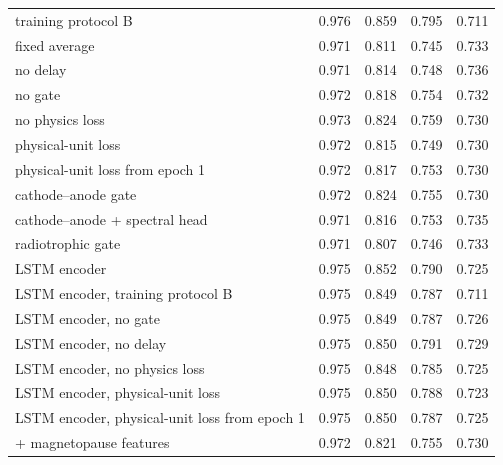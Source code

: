 \begin{table}[!t]
\begin{adjustbox}{max width=\linewidth}
\begin{tabular}{lcccc}
\quad training protocol B & 0.976 & 0.859 & 0.795 & 0.711 \\
\quad fixed average & 0.971 & 0.811 & 0.745 & 0.733 \\
\quad no delay & 0.971 & 0.814 & 0.748 & 0.736 \\
\quad no gate & 0.972 & 0.818 & 0.754 & 0.732 \\
\quad no physics loss & 0.973 & 0.824 & 0.759 & 0.730 \\
\quad physical-unit loss & 0.972 & 0.815 & 0.749 & 0.730 \\
\quad physical-unit loss from epoch 1 & 0.972 & 0.817 & 0.753 & 0.730 \\
\quad cathode--anode gate & 0.972 & 0.824 & 0.755 & 0.730 \\
\quad cathode--anode + spectral head & 0.971 & 0.816 & 0.753 & 0.735 \\
\quad radiotrophic gate & 0.971 & 0.807 & 0.746 & 0.733 \\
\quad LSTM encoder & 0.975 & 0.852 & 0.790 & 0.725 \\
\quad LSTM encoder, training protocol B & 0.975 & 0.849 & 0.787 & 0.711 \\
\quad LSTM encoder, no gate & 0.975 & 0.849 & 0.787 & 0.726 \\
\quad LSTM encoder, no delay & 0.975 & 0.850 & 0.791 & 0.729 \\
\quad LSTM encoder, no physics loss & 0.975 & 0.848 & 0.785 & 0.725 \\
\quad LSTM encoder, physical-unit loss & 0.975 & 0.850 & 0.788 & 0.723 \\
\quad LSTM encoder, physical-unit loss from epoch 1 & 0.975 & 0.850 & 0.787 & 0.725 \\
\quad + magnetopause features & 0.972 & 0.821 & 0.755 & 0.730 \\
\bottomrule
\end{tabular}
\end{adjustbox}

\par\vspace{0.5ex}{\footnotesize\raggedright Seed standard deviations are at most 0.011 for the other controls without residual, 0.018 for the residual Transformers, 0.027 for the STORM-PhysNet variants with a Transformer encoder, 0.008 for the models with an LSTM encoder and the persistence residual, and 0.053 for the CNN.\par}
\end{table}
